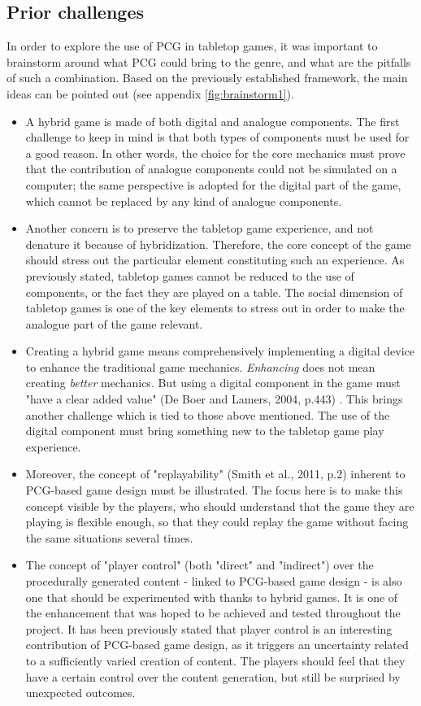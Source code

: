 \subsection{Prior challenges}
In order to explore the use of PCG in tabletop games, it was important to brainstorm around what PCG could bring to the genre, and what are the pitfalls of such a combination. Based on the previously established framework, the main ideas can be pointed out (see appendix \ref{fig:brainstorm1}).
\begin{itemize}
\item A hybrid game is made of both digital and analogue components. The first challenge to keep in mind is that both types of components must be used for a good reason. In other words, the choice for the core mechanics must prove that the contribution of analogue components could not be simulated on a computer; the same perspective is adopted for the digital part of the game, which cannot be replaced by any kind of analogue components.  
\item Another concern is to preserve the tabletop game experience, and not denature it because of hybridization. Therefore, the core concept of the game should stress out the particular element constituting such an experience. As previously stated, tabletop games cannot be reduced to the use of components, or the fact they are played on a table. The social dimension of tabletop games is one of the key elements to stress out in order to make the analogue part of the game relevant.
\item Creating a hybrid game means comprehensively implementing a digital device to enhance the traditional game mechanics. \textit{Enhancing} does not mean creating \textit{better} mechanics. But using a digital component in the game must "have a clear added value" (De Boer and Lamers, 2004, p.443) \cite{chap:aug}. This brings another challenge which is tied to those above mentioned. The use of the digital component must bring something new to the tabletop game play experience.
\item Moreover, the concept of "replayability" (Smith et al., 2011, p.2) \cite{pdf:pcgbased} inherent to PCG-based game design must be illustrated. The focus here is to make this concept visible by the players, who should understand that the game they are playing is flexible enough, so that they could replay the game without facing the same situations several times.
\item The concept of "player control" (both "direct" and "indirect") \cite{pdf:pcgbased} over the procedurally generated content - linked to PCG-based game design - is also one that should be experimented with thanks to hybrid games. It is one of the enhancement that was hoped to be achieved and tested throughout the project. It has been previously stated that player control is an interesting contribution of PCG-based game design, as it triggers an uncertainty related to a sufficiently varied creation of content. The players should feel that they have a certain control over the content generation, but still be surprised by unexpected outcomes.

\end{itemize}
